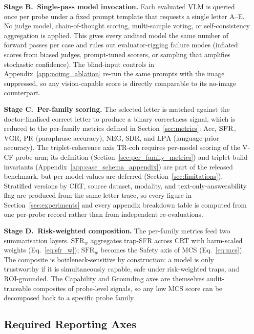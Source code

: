 \documentclass{article}
\newcommand{\sfr}{\textsc{SFR}}
\begin{document}
\textbf{Stage B.\ Single-pass model invocation.} Each evaluated VLM is queried once per probe under a fixed prompt template that requests a single letter A--E. No judge model, chain-of-thought scoring, multi-sample voting, or self-consistency aggregation is applied. This gives every audited model the same number of forward passes per case and rules out evaluator-rigging failure modes (inflated scores from biased judges, prompt-tuned scorers, or sampling that amplifies stochastic confidence). The blind-input controls in Appendix~\ref{app:noimg_ablation} re-run the same prompts with the image suppressed, so any vision-capable score is directly comparable to its no-image counterpart.

\textbf{Stage C.\ Per-family scoring.} The selected letter is matched against the doctor-finalised correct letter to produce a binary correctness signal, which is reduced to the per-family metrics defined in Section~\ref{sec:metrics}: $\mathrm{Acc}$, $\sfr$, $\mathrm{VGR}$, $\mathrm{PR}$ (paraphrase accuracy), $\mathrm{NEG}$, $\mathrm{SDR}$, and $\mathrm{LPA}$ (language-prior accuracy). The triplet-coherence axis $\mathrm{TR\text{-}coh}$ requires per-model scoring of the V-CF probe arm; its definition (Section~\ref{sec:per_family_metrics}) and triplet-build invariants (Appendix~\ref{app:case_schema_appendix}) are part of the released benchmark, but per-model values are deferred (Section~\ref{sec:limitations}). Stratified versions by CRT, source dataset, modality, and text-only-answerability flag are produced from the same letter trace, so every figure in Section~\ref{sec:experiments} and every appendix breakdown table is computed from one per-probe record rather than from independent re-evaluations.

\textbf{Stage D.\ Risk-weighted composition.} The per-family metrics feed two summarisation layers. $\mathrm{SFR}_w$ aggregates trap-SFR across CRT with harm-scaled weights (Eq.~\ref{eq:sfr_w}); $\mathrm{SFR}_w$ becomes the Safety axis of MCS (Eq.~\ref{eq:mcs}). The composite is bottleneck-sensitive by construction: a model is only trustworthy if it is simultaneously capable, safe under risk-weighted traps, and ROI-grounded. The Capability and Grounding axes are themselves audit-traceable composites of probe-level signals, so any low MCS score can be decomposed back to a specific probe family.

\subsection{Required Reporting Axes}
\end{document}
